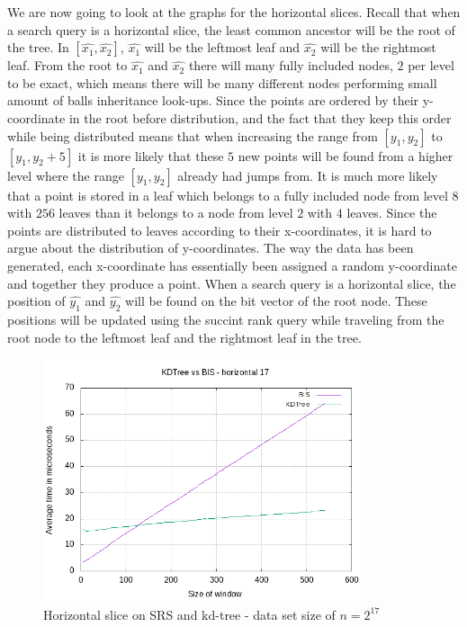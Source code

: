 We are now going to look at the graphs for the horizontal slices. Recall that when a search query is a horizontal slice, the least common ancestor will be the root of the tree. In $[\hat{x_1}, \hat{x_2}]$, $\hat{x_1}$ will be the leftmost leaf and $\hat{x_2}$ will be the rightmost leaf. From the root to $\hat{x_1}$ and $\hat{x_2}$ there will many fully included nodes, $2$ per level to be exact, which means there will be many different nodes performing small amount of balls inheritance look-ups. Since the points are ordered by their y-coordinate in the root before distribution, and the fact that they keep this order while being distributed means that when increasing the range from $[y_1, y_2]$ to $[y_1, y_2 + 5]$ it is more likely that these $5$ new points will be found from a higher level where the range $[y_1, y_2]$ already had jumps from. It is much more likely that a point is stored in a leaf which belongs to a fully included node from level $8$ with $256$ leaves than it belongs to a node from level $2$ with $4$ leaves. Since the points are distributed to leaves according to their x-coordinates, it is hard to argue about the distribution of y-coordinates. The way the data has been generated, each x-coordinate has essentially been assigned a random y-coordinate and together they produce a point. When a search query is a horizontal slice, the position of $\hat{y_1}$ and $\hat{y_2}$ will be found on the bit vector of the root node. These positions will be updated using the succint rank query while traveling from the root node to the leftmost leaf and the rightmost leaf in the tree. 

\begin{figure}[h]
    \centering
    \includegraphics[width = 0.85\textwidth]{pictures/analysis/hori_17.png}
    \caption{Horizontal slice on SRS and kd-tree - data set size of $n=2^{17}$}\label{fig:hori_17}
\end{figure}

